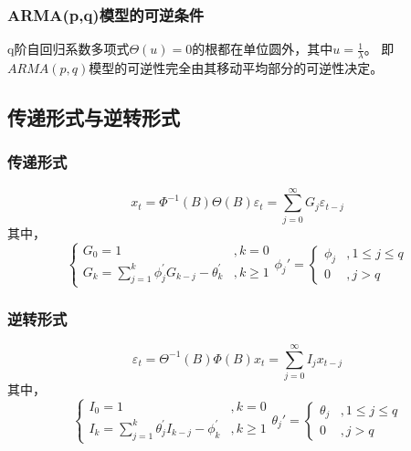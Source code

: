\documentclass[12pt, a4paper, oneside]{ctexbook}
\begin{document}
\subsubsection{ARMA(p,q)模型的可逆条件}
q阶自回归系数多项式$\Theta(u)=0$的根都在单位圆外，其中$u = \frac1\lambda$。
即$ARMA(p,q)$模型的可逆性完全由其移动平均部分的可逆性决定。

\subsection{传递形式与逆转形式}
\subsubsection{传递形式}
\begin{equation}\label{eq3.29}
    x_t=\Phi^{-1}(B)\Theta(B)\varepsilon_t=\sum_{j=0}^\infty G_j\varepsilon_{t-j}
\end{equation}
其中，
\begin{equation*}
    \begin{cases}
        G_0=1                                                    & ,k=0      \\
        G_k=\sum_{j=1}^k\phi_j^{\prime}G_{k-j}-\theta_k^{\prime} & ,  k\geq1
    \end{cases}
    \phi_j'=\begin{cases}
        \phi_j & ,1\leq j\leq q \\
        0      & ,j>q
    \end{cases}
\end{equation*}

\subsubsection{逆转形式}
\begin{equation}
    \varepsilon_t=\Theta^{-1}(B)\Phi(B)x_t=\sum_{j=0}^\infty I_jx_{t-j}
\end{equation}
其中，
\begin{equation*}
    \begin{cases}
        I_0=1                                                    & ,k=0      \\
        I_k=\sum_{j=1}^k\theta_j^{\prime}I_{k-j}-\phi_k^{\prime} & ,  k\geq1
    \end{cases}
    \theta_j'=\begin{cases}
        \theta_j & ,1\leq j\leq q \\
        0        & ,j>q
    \end{cases}
\end{equation*}
\end{document}
